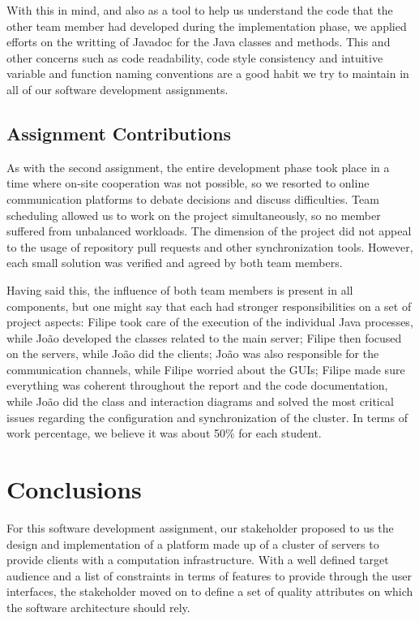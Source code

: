 \documentclass[12pt]{article}
\begin{document}
With this in mind, and also as a tool to help us understand the code that the other team member had developed during the implementation phase, we applied efforts
on the writting of Javadoc for the Java classes and methods.
This and other concerns such as code readability, code style consistency and intuitive variable and function naming conventions are a good habit we try to maintain
in all of our software development assignments.

\subsection{Assignment Contributions} \label{contributions} %

As with the second assignment, the entire development phase took place in a time where on-site cooperation was not possible, so we resorted to online
communication platforms to debate decisions and discuss difficulties.
Team scheduling allowed us to work on the project simultaneously, so no member suffered from unbalanced workloads.
The dimension of the project did not appeal to the usage of repository pull requests and other synchronization tools.
However, each small solution was verified and agreed by both team members.

Having said this, the influence of both team members is present in all components, but one might say that each had stronger responsibilities on a set of project aspects:
Filipe took care of the execution of the individual Java processes, while João developed the classes related to the main server;
Filipe then focused on the servers, while João did the clients;
João was also responsible for the communication channels, while Filipe worried about the GUIs;
Filipe made sure everything was coherent throughout the report and the code
documentation, while João did the class and interaction diagrams and solved the most critical issues regarding the configuration and synchronization of the cluster.
In terms of work percentage, we believe it was about 50\% for each student.

\newpage
\section*{Conclusions} \label{conclusions} %

For this software development assignment, our stakeholder proposed to us the design and implementation of a platform made up of a cluster of servers to provide
clients with a computation infrastructure.
With a well defined target audience and a list of constraints in terms of features to provide through the user interfaces, the stakeholder moved on to define
a set of quality attributes on which the software architecture should rely.
\end{document}
